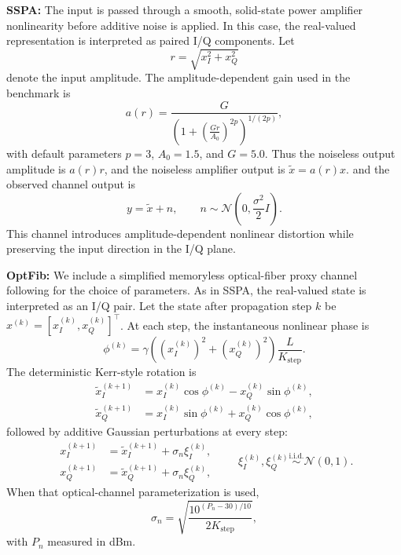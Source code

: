 \documentclass[conference]{IEEEtran}
\begin{document}
\textbf{SSPA:}
The input is passed through a smooth, solid-state power amplifier nonlinearity before additive noise is applied.
In this case, the real-valued representation is interpreted as paired I/Q components.
Let
\begin{equation}
r = \sqrt{x_I^2 + x_Q^2}
\end{equation}
denote the input amplitude.
The amplitude-dependent gain used in the benchmark is
\begin{equation}
a(r)
=
\frac{G}{\left(1+\left(\frac{Gr}{A_0}\right)^{2p}\right)^{1/(2p)}},
\end{equation}
with default parameters \(p=3\), \(A_0=1.5\), and \(G=5.0\).
Thus the noiseless output amplitude is \(a(r)r\), and the noiseless amplifier output is \(\tilde{x} = a(r)x\).
and the observed channel output is
\begin{equation}
y = \tilde{x} + n,
\qquad
n \sim \mathcal{N}\!\left(0,\frac{\sigma^2}{2}I\right).
\end{equation}
This channel introduces amplitude-dependent nonlinear distortion while preserving the input direction in the I/Q plane.

\textbf{OptFib:}
We include a simplified memoryless optical-fiber proxy channel following \cite{li2018e2efiber} for the choice of parameters.
As in SSPA, the real-valued state is interpreted as an I/Q pair.
Let the state after propagation step \(k\) be \(x^{(k)} = [x_I^{(k)},x_Q^{(k)}]^\top\).
At each step, the instantaneous nonlinear phase is
\begin{equation}
\phi^{(k)}
=
\gamma
\left(\left(x_I^{(k)}\right)^2 + \left(x_Q^{(k)}\right)^2\right)\frac{L}{K_{\text{step}}}.
\end{equation}
The deterministic Kerr-style rotation is
\begin{equation}
\begin{aligned}
\tilde{x}_I^{(k+1)} &= x_I^{(k)}\cos\phi^{(k)} - x_Q^{(k)}\sin\phi^{(k)}, \\
\tilde{x}_Q^{(k+1)} &= x_I^{(k)}\sin\phi^{(k)} + x_Q^{(k)}\cos\phi^{(k)},
\end{aligned}
\end{equation}
followed by additive Gaussian perturbations at every step:
\begin{equation}
\begin{aligned}
x_I^{(k+1)} &= \tilde{x}_I^{(k+1)} + \sigma_n \xi_I^{(k)}, \\
x_Q^{(k+1)} &= \tilde{x}_Q^{(k+1)} + \sigma_n \xi_Q^{(k)},
\end{aligned}
\qquad
\xi_I^{(k)},\xi_Q^{(k)} \overset{\text{i.i.d.}}{\sim} \mathcal{N}(0,1).
\end{equation}
When that optical-channel parameterization is used,
\begin{equation}
\sigma_n
=
\sqrt{\frac{10^{(P_n-30)/10}}{2K_{\text{step}}}},
\end{equation}
with \(P_n\) measured in dBm.
\end{document}
